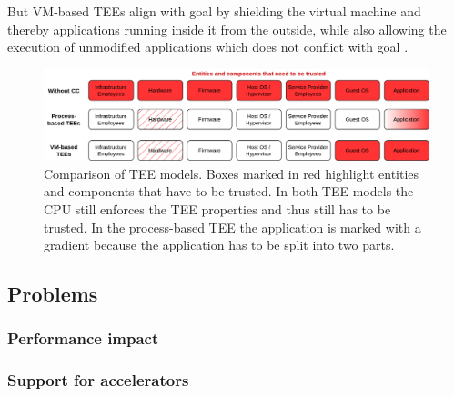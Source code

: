 But VM-based TEEs align with goal  by shielding the virtual
machine and thereby applications running inside it from the outside, while also
allowing the execution of unmodified applications which does not conflict with
goal .

\begin{figure}
  \centering
  \includegraphics[width=\linewidth]{resources/cc-tee-comparison.png}
  \caption[Comparison of trusted execution environment models]{
    Comparison of TEE models. Boxes marked in red highlight entities and
    components that have to be trusted. In both TEE models the CPU still
    enforces the TEE properties and thus still has to be trusted. In the
    process-based TEE the application is marked with a gradient because the
    application has to be split into two parts.
  }
  \label{figure:cc-tee-comparison}
\end{figure}

\subsection{Problems}

\subsubsection{Performance impact}


\subsubsection{Support for accelerators}


